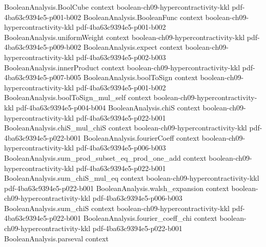 \begin{theorem}
\label{BooleanAnalysis.Hypercontractivity.weak_two_function_hypercontractivity}
\leanok
{}
\proofstep
  {BooleanAnalysis.BoolCube}
  {context}
  {boolean-ch09-hypercontractivity-kkl}
  {pdf-4ba63c9394e5-p001-b002}
\proofstep
  {BooleanAnalysis.BooleanFunc}
  {context}
  {boolean-ch09-hypercontractivity-kkl}
  {pdf-4ba63c9394e5-p001-b002}
\proofstep
  {BooleanAnalysis.uniformWeight}
  {context}
  {boolean-ch09-hypercontractivity-kkl}
  {pdf-4ba63c9394e5-p009-b002}
\proofstep
  {BooleanAnalysis.expect}
  {context}
  {boolean-ch09-hypercontractivity-kkl}
  {pdf-4ba63c9394e5-p002-b003}
\proofstep
  {BooleanAnalysis.innerProduct}
  {context}
  {boolean-ch09-hypercontractivity-kkl}
  {pdf-4ba63c9394e5-p007-b005}
\proofstep
  {BooleanAnalysis.boolToSign}
  {context}
  {boolean-ch09-hypercontractivity-kkl}
  {pdf-4ba63c9394e5-p001-b002}
\proofstep
  {BooleanAnalysis.boolToSign_mul_self}
  {context}
  {boolean-ch09-hypercontractivity-kkl}
  {pdf-4ba63c9394e5-p004-b004}
\proofstep
  {BooleanAnalysis.chiS}
  {context}
  {boolean-ch09-hypercontractivity-kkl}
  {pdf-4ba63c9394e5-p022-b001}
\proofstep
  {BooleanAnalysis.chiS_mul_chiS}
  {context}
  {boolean-ch09-hypercontractivity-kkl}
  {pdf-4ba63c9394e5-p022-b001}
\proofstep
  {BooleanAnalysis.fourierCoeff}
  {context}
  {boolean-ch09-hypercontractivity-kkl}
  {pdf-4ba63c9394e5-p006-b003}
\proofstep
  {BooleanAnalysis.sum_prod_subset_eq_prod_one_add}
  {context}
  {boolean-ch09-hypercontractivity-kkl}
  {pdf-4ba63c9394e5-p022-b001}
\proofstep
  {BooleanAnalysis.sum_chiS_mul_eq}
  {context}
  {boolean-ch09-hypercontractivity-kkl}
  {pdf-4ba63c9394e5-p022-b001}
\proofstep
  {BooleanAnalysis.walsh_expansion}
  {context}
  {boolean-ch09-hypercontractivity-kkl}
  {pdf-4ba63c9394e5-p006-b003}
\proofstep
  {BooleanAnalysis.sum_chiS}
  {context}
  {boolean-ch09-hypercontractivity-kkl}
  {pdf-4ba63c9394e5-p022-b001}
\proofstep
  {BooleanAnalysis.fourier_coeff_chi}
  {context}
  {boolean-ch09-hypercontractivity-kkl}
  {pdf-4ba63c9394e5-p022-b001}
\proofstep
  {BooleanAnalysis.parseval}
  {context}

\end{theorem}
